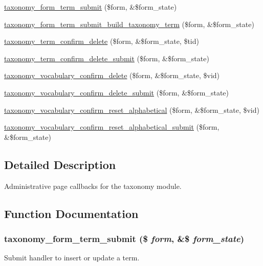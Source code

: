 \begin{DoxyCompactItemize}
\item 
\hyperlink{taxonomy_8admin_8inc_a47414380bfb0caa70eb3d35a7e153ac0}{taxonomy\_\-form\_\-term\_\-submit} (\$form, \&\$form\_\-state)
\item 
\hyperlink{taxonomy_8admin_8inc_a8bc6a33a0efac58f69913a7a5301e7ee}{taxonomy\_\-form\_\-term\_\-submit\_\-build\_\-taxonomy\_\-term} (\$form, \&\$form\_\-state)
\item 
\hyperlink{group__forms_gabdfecf623fb2fe428cb6401de1375662}{taxonomy\_\-term\_\-confirm\_\-delete} (\$form, \&\$form\_\-state, \$tid)
\item 
\hyperlink{taxonomy_8admin_8inc_ab96dee24a79d706b4b28d26ceac5e946}{taxonomy\_\-term\_\-confirm\_\-delete\_\-submit} (\$form, \&\$form\_\-state)
\item 
\hyperlink{group__forms_gaa1e0e524fc8e3642b059c8186a4cd4f8}{taxonomy\_\-vocabulary\_\-confirm\_\-delete} (\$form, \&\$form\_\-state, \$vid)
\item 
\hyperlink{taxonomy_8admin_8inc_a37c587803cac8e509913d1374e897040}{taxonomy\_\-vocabulary\_\-confirm\_\-delete\_\-submit} (\$form, \&\$form\_\-state)
\item 
\hyperlink{group__forms_ga3af4162d583df90dc6511e82d25bf374}{taxonomy\_\-vocabulary\_\-confirm\_\-reset\_\-alphabetical} (\$form, \&\$form\_\-state, \$vid)
\item 
\hyperlink{taxonomy_8admin_8inc_a682c533b8249e033ce7e612550c9b68d}{taxonomy\_\-vocabulary\_\-confirm\_\-reset\_\-alphabetical\_\-submit} (\$form, \&\$form\_\-state)
\end{DoxyCompactItemize}


\subsection{Detailed Description}
Administrative page callbacks for the taxonomy module. 

\subsection{Function Documentation}
\hypertarget{taxonomy_8admin_8inc_a47414380bfb0caa70eb3d35a7e153ac0}{
\subsubsection[{taxonomy\_\-form\_\-term\_\-submit}]{\setlength{\rightskip}{0pt plus 5cm}taxonomy\_\-form\_\-term\_\-submit (\$ {\em form}, \/  \&\$ {\em form\_\-state})}}
\label{taxonomy_8admin_8inc_a47414380bfb0caa70eb3d35a7e153ac0}
Submit handler to insert or update a term.

